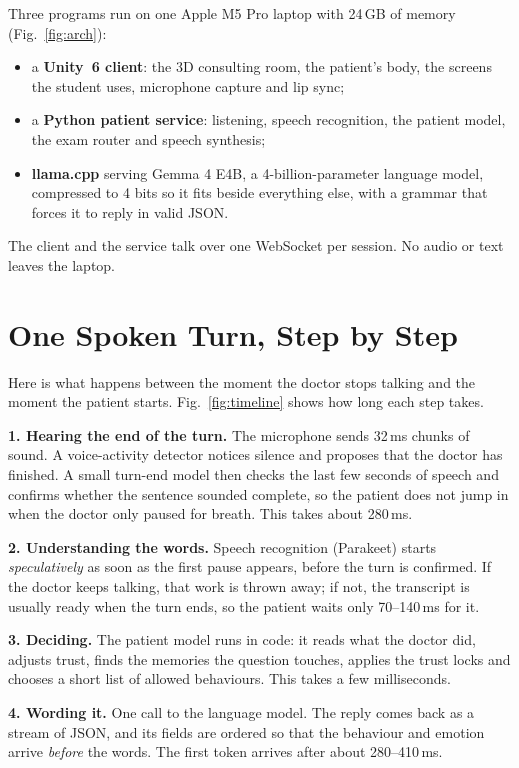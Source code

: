 \documentclass[journal]{IEEEtran}
\begin{document}
Three programs run on one Apple M5 Pro laptop with 24\,GB of memory (Fig.~\ref{fig:arch}):
\begin{itemize}
\item a \textbf{Unity~6 client}: the 3D consulting room, the patient's body, the screens the student uses, microphone capture and lip sync;
\item a \textbf{Python patient service}: listening, speech recognition, the patient model, the exam router and speech synthesis;
\item \textbf{llama.cpp} \cite{llamacpp} serving Gemma 4 E4B, a 4-billion-parameter language model, compressed to 4 bits so it fits beside
everything else, with a grammar that forces it to reply in valid JSON.
\end{itemize}
The client and the service talk over one WebSocket per session. No audio or text leaves the laptop.

\section{One Spoken Turn, Step by Step}
Here is what happens between the moment the doctor stops talking and the moment the patient starts. Fig.~\ref{fig:timeline} shows how long
each step takes.

\textbf{1. Hearing the end of the turn.} The microphone sends 32\,ms chunks of sound. A voice-activity detector notices silence and proposes
that the doctor has finished. A small turn-end model then checks the last few seconds of speech and confirms whether the sentence sounded
complete, so the patient does not jump in when the doctor only paused for breath. This takes about 280\,ms.

\textbf{2. Understanding the words.} Speech recognition (Parakeet) starts \emph{speculatively} as soon as the first pause appears, before the
turn is confirmed. If the doctor keeps talking, that work is thrown away; if not, the transcript is usually ready when the turn ends, so the
patient waits only 70--140\,ms for it.

\textbf{3. Deciding.} The patient model runs in code: it reads what the doctor did, adjusts trust, finds the memories the question touches,
applies the trust locks and chooses a short list of allowed behaviours. This takes a few milliseconds.

\textbf{4. Wording it.} One call to the language model. The reply comes back as a stream of JSON, and its fields are ordered so that the
behaviour and emotion arrive \emph{before} the words. The first token arrives after about 280--410\,ms.
\end{document}
